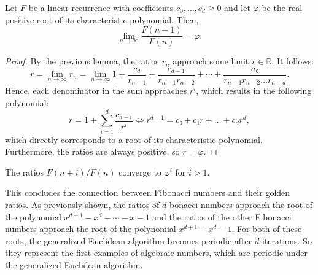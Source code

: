 \begin{theorem}
  Let $F$ be a linear recurrence with coefficients $c_0, \dots, c_d ≥ 0$
  and let $φ$ be the real positive root of its characteristic polynomial.
  Then,
  \[
    \lim_{n \to \infty} \frac{F(n + 1)}{F(n)} = φ.
  \]
\end{theorem}

\begin{proof}
  By the previous lemma, the ratios $r_n$ approach some limit $r ∈ ℝ$. It follows:
  \[
    r
    = \lim_{n → ∞} r_n
    = \lim_{n → ∞} 1 + \frac{c_d}{r_{n-1}} + \frac{c_{d-1}}{r_{n-1} r_{n-2}} + ⋯ + \frac{a₀}{r_{n-1} r_{n-2} \dots r_{n-d}}.
  \]
  Hence, each denominator in the sum approaches $r^i$,
  which results in the following polynomial:
  \[
    r = 1 + \sum_{i = 1}^d \frac{c_{d - i}}{r^i}
    \iff
    r^{d+1} = c₀ + c₁ r + \dots + c_d r^d,
  \]
  which directly corresponds to a root of its characteristic polynomial.
  Furthermore, the ratios are always positive, so $r = φ$.
\end{proof}

\begin{corollary}
  The ratios $F(n + i) / F(n)$ converge to $φ^i$ for $i > 1$.
\end{corollary}

This concludes the connection between Fibonacci numbers and their golden ratios.
As previously shown, the ratios of $d$-bonacci numbers approach the root of the polynomial $x^{d+1} - x^d - ⋯ - x - 1$
and the ratios of the other Fibonacci numbers approach the root of the polynomial $x^{d+1} - x^d - 1$.
For both of these roots, the generalized Euclidean algorithm becomes periodic after $d$ iterations.
So they represent the first examples of algebraic numbers, which are periodic
under the generalized Euclidean algorithm.
